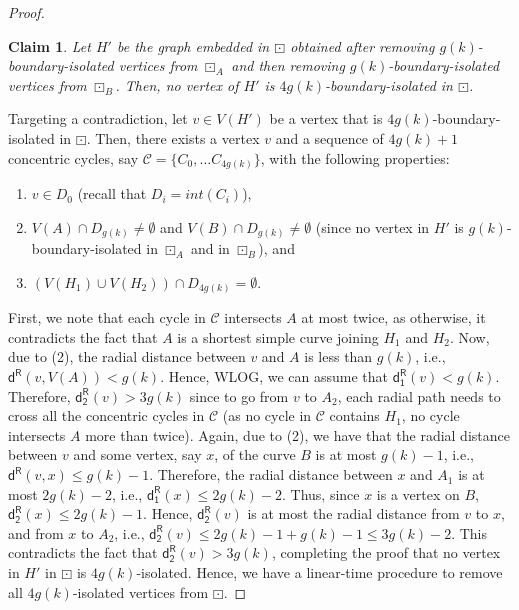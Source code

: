 \documentclass{article}
\newtheorem{claim}[theorem]{Claim}
\numberwithin{claimcounter}{lemma}
\newenvironment{proofofclaim}{\renewcommand{\qed}{\hfill $\diamond$}
  \renewcommand{\proofname}{Proof of Claim}\proof}{\endproof}
\begin{document}
\begin{proof}
\begin{claim}
    Let $H'$ be the graph embedded in $\boxdot$ obtained after removing $g(k)$-boundary-isolated vertices from $\boxdot_A$ and then removing $g(k)$-boundary-isolated vertices from $\boxdot_B$. Then, no vertex of $H'$ is $4g(k)$-boundary-isolated in $\boxdot$. 
\end{claim}
\begin{proofofclaim}
    Targeting a contradiction, let $v\in V(H')$ be a vertex that is $4g(k)$-boundary-isolated in $\boxdot$. Then, there exists a vertex $v$ and a sequence of $4g(k)+1$ concentric cycles, say $\mathcal{C} = \{C_0,\ldots C_{4g(k)}\}$, with the following properties:
    \begin{enumerate}
        \item $v \in D_0$ (recall that $D_i = int(C_i)$),
        \item $V(A) \cap D_{g(k)} \neq \emptyset$ and $V(B) \cap D_{g(k)} \neq \emptyset$ (since no vertex in $H'$ is $g(k)$-boundary-isolated in $\boxdot_A$ and in $\boxdot_B$), and 
        \item $(V(H_1) \cup V(H_2)) \cap D_{4g(k)} = \emptyset$.
    \end{enumerate}

    First, we note that each cycle in $\mathcal{C}$ intersects $A$ at most twice, as otherwise, it contradicts the fact that $A$ is a shortest simple curve joining $H_1$ and $H_2$.
    Now, due to (2), the radial distance between $v$ and $A$ is less than $g(k)$, i.e., $\mathsf{d^R}(v,V(A)) < g(k)$. Hence, WLOG, we can assume that $\mathsf{d^R_1}(v) < g(k)$. Therefore, $\mathsf{d^R_2}(v) > 3g(k)$ since to go from $v$ to $A_2$, each radial path needs to cross all the concentric cycles in $\mathcal{C}$ (as no cycle in $\mathcal{C}$ contains $H_1$, no cycle intersects $A$ more than twice). Again, due to (2), we have that the radial distance between $v$ and some vertex, say $x$, of the curve $B$ is at most $g(k)-1$, i.e., $\mathsf{d^R}(v,x) \leq g(k)-1$. Therefore, the radial distance between $x$ and $A_1$ is at most $2g(k)-2$, i.e., $\mathsf{d^R_1}(x) \leq 2g(k)-2$. Thus, since $x$ is a vertex on $B$, $\mathsf{d^R_2}(x) \leq 2g(k)-1$. Hence, $\mathsf{d^R_2}(v)$ is at most the radial distance from $v$ to $x$, and from $x$ to $A_2$, i.e., $\mathsf{d^R_2}(v) \leq 2g(k)-1+g(k)-1 \leq 3g(k)-2$. This contradicts the fact that $\mathsf{d^R_2}(v)>3 g(k)$, completing the proof that no vertex in $H'$ in $\boxdot$ is $4g(k)$-isolated.   
\end{proofofclaim}
Hence, we have a linear-time procedure to remove all $4g(k)$-isolated vertices from $\boxdot$. 
\end{proof}
\end{document}
